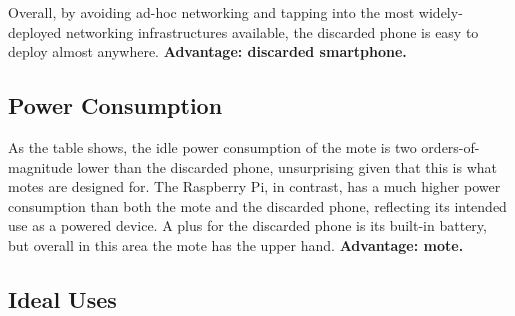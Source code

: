 Overall, by avoiding ad-hoc networking and tapping into the most
widely-deployed networking infrastructures available, the discarded phone is
easy to deploy almost anywhere. \textbf{Advantage: discarded smartphone.}

\subsection{Power Consumption}

As the table shows, the idle power consumption of the mote is two
orders-of-magnitude lower than the discarded phone, unsurprising given that
this is what motes are designed for. The Raspberry Pi, in contrast, has a
much higher power consumption than both the mote and the discarded phone,
reflecting its intended use as a powered device. A plus for the discarded
phone is its built-in battery, but overall in this area the mote has the
upper hand. \textbf{Advantage: mote.}

\subsection{Ideal Uses}
